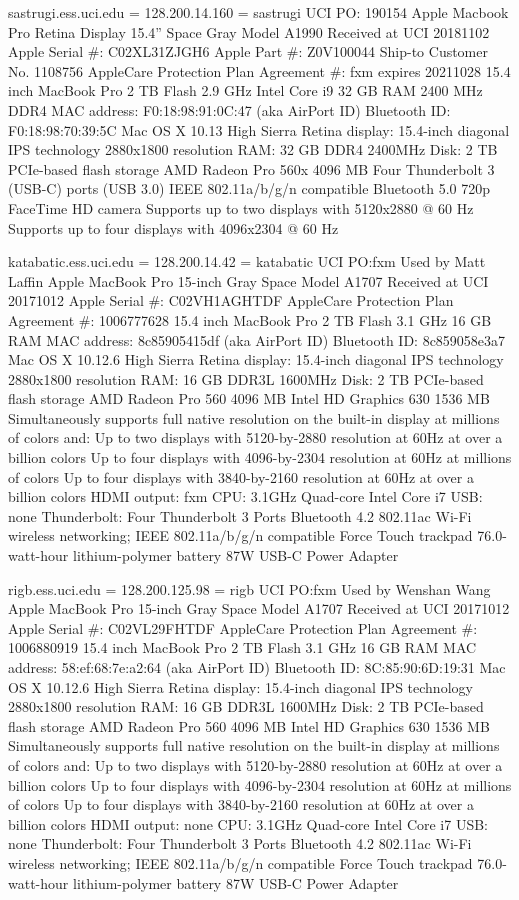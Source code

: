 \documentclass[12pt,twoside]{article}
\begin{document}
sastrugi.ess.uci.edu = 128.200.14.160 = sastrugi
UCI PO: 190154
Apple Macbook Pro Retina Display 15.4'' Space Gray
Model A1990
Received at UCI 20181102
Apple Serial \#: C02XL31ZJGH6
Apple Part \#: Z0V100044
Ship-to Customer No. 1108756
AppleCare Protection Plan Agreement \#: fxm expires 20211028
15.4 inch MacBook Pro
2 TB Flash
2.9 GHz Intel Core i9
32 GB RAM 2400 MHz DDR4
MAC address: F0:18:98:91:0C:47 (aka AirPort ID)
Bluetooth ID: F0:18:98:70:39:5C
Mac OS X 10.13 High Sierra
Retina display: 15.4-inch diagonal
IPS technology 2880x1800 resolution
RAM: 32 GB DDR4 2400MHz
Disk: 2 TB PCIe-based flash storage
AMD Radeon Pro 560x 4096 MB
Four Thunderbolt 3 (USB-C) ports (USB 3.0)
IEEE 802.11a/b/g/n compatible
Bluetooth 5.0
720p FaceTime HD camera
Supports up to two displays with 5120x2880 @ 60 Hz 
Supports up to four displays with 4096x2304 @ 60 Hz 

katabatic.ess.uci.edu = 128.200.14.42 = katabatic
UCI PO:fxm
Used by Matt Laffin
Apple MacBook Pro 15-inch Gray Space
Model A1707
Received at UCI 20171012
Apple Serial \#: C02VH1AGHTDF
AppleCare Protection Plan Agreement \#: 1006777628
15.4 inch MacBook Pro
2 TB Flash
3.1 GHz
16 GB RAM
MAC address: 8c85905415df (aka AirPort ID)
Bluetooth ID: 8c859058e3a7
Mac OS X 10.12.6 High Sierra
Retina display: 15.4-inch diagonal
IPS technology 2880x1800 resolution
RAM: 16 GB DDR3L 1600MHz
Disk: 2 TB PCIe-based flash storage
AMD Radeon Pro 560 4096 MB Intel HD Graphics 630 1536 MB
Simultaneously supports full native resolution on the built-in display at millions of colors and:
Up to two displays with 5120-by-2880 resolution at 60Hz at over a billion colors
Up to four displays with 4096-by-2304 resolution at 60Hz at millions of colors
Up to four displays with 3840-by-2160 resolution at 60Hz at over a billion colors
HDMI output: fxm
CPU: 3.1GHz Quad-core Intel Core i7
USB: none
Thunderbolt: Four Thunderbolt 3 Ports
Bluetooth 4.2
802.11ac Wi-Fi wireless networking; IEEE 802.11a/b/g/n compatible
Force Touch trackpad
76.0-watt-hour lithium-polymer battery
87W USB-C Power Adapter

rigb.ess.uci.edu = 128.200.125.98 = rigb
UCI PO:fxm
Used by Wenshan Wang
Apple MacBook Pro 15-inch Gray Space
Model A1707
Received at UCI 20171012
Apple Serial \#: C02VL29FHTDF
AppleCare Protection Plan Agreement \#: 1006880919
15.4 inch MacBook Pro
2 TB Flash
3.1 GHz
16 GB RAM
MAC address: 58:ef:68:7e:a2:64 (aka AirPort ID)
Bluetooth ID: 8C:85:90:6D:19:31
Mac OS X 10.12.6 High Sierra
Retina display: 15.4-inch diagonal
IPS technology 2880x1800 resolution
RAM: 16 GB DDR3L 1600MHz
Disk: 2 TB PCIe-based flash storage
AMD Radeon Pro 560 4096 MB Intel HD Graphics 630 1536 MB
Simultaneously supports full native resolution on the built-in display at millions of colors and:
Up to two displays with 5120-by-2880 resolution at 60Hz at over a billion colors
Up to four displays with 4096-by-2304 resolution at 60Hz at millions of colors
Up to four displays with 3840-by-2160 resolution at 60Hz at over a billion colors
HDMI output: none
CPU: 3.1GHz Quad-core Intel Core i7
USB: none
Thunderbolt: Four Thunderbolt 3 Ports
Bluetooth 4.2
802.11ac Wi-Fi wireless networking; IEEE 802.11a/b/g/n compatible
Force Touch trackpad
76.0-watt-hour lithium-polymer battery
87W USB-C Power Adapter
\end{document}
